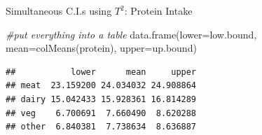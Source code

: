 \documentclass[
  ignorenonframetext,
]{beamer}
\newenvironment{Shaded}{\begin{snugshade}}{\end{snugshade}}
\newcommand{\AttributeTok}[1]{\textcolor[rgb]{0.77,0.63,0.00}{#1}}
\newcommand{\CommentTok}[1]{\textcolor[rgb]{0.56,0.35,0.01}{\textit{#1}}}
\newcommand{\FunctionTok}[1]{\textcolor[rgb]{0.00,0.00,0.00}{#1}}
\newcommand{\NormalTok}[1]{#1}
\begin{document}
\begin{frame}[fragile]{Simultaneous C.I.s using \(T^2\): Protein Intake}
\protect\hypertarget{simultaneous-c.i.s-using-t2-protein-intake-1}{}
\begin{Shaded}
\begin{Highlighting}[]
\CommentTok{\#put everything into a table}
\FunctionTok{data.frame}\NormalTok{(}\AttributeTok{lower=}\NormalTok{low.bound, }\AttributeTok{mean=}\FunctionTok{colMeans}\NormalTok{(protein), }
           \AttributeTok{upper=}\NormalTok{up.bound)}
\end{Highlighting}
\end{Shaded}

\begin{verbatim}
##           lower      mean     upper
## meat  23.159200 24.034032 24.908864
## dairy 15.042433 15.928361 16.814289
## veg    6.700691  7.660490  8.620288
## other  6.840381  7.738634  8.636887
\end{verbatim}
\end{frame}
\end{document}
